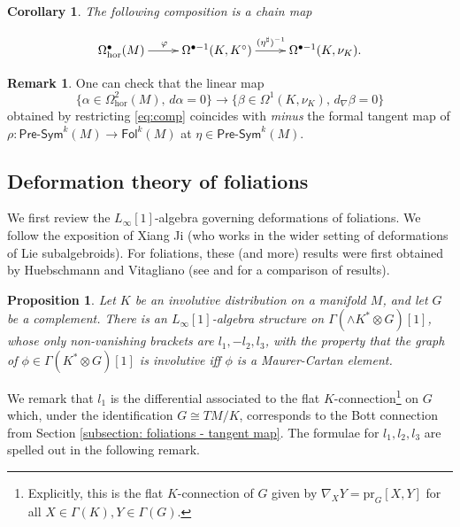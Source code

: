 \documentclass[11pt,thmsa]{amsart}
\newtheorem{proposition}[theorem]{Proposition}
\newtheorem{corollary}[theorem]{Corollary}
\theoremstyle{definition}
\newtheorem{remark}[theorem]{Remark}
\newcommand{\Presym}{\mathsf{Pre}\textrm{-}\mathsf{Sym}}
\newcommand{\hor}{\mathrm{hor}}
\newcommand{\Foliations}{\mathsf{Fol}}
\begin{document}
 \begin{corollary}\label{rem:Bottchainmap}
 The following composition is a chain map
 
\begin{equation}\label{eq:comp}
\xymatrix{
 \Omega^\bullet_\hor(M) \ar[r]^(0.45){\varphi} & \Omega^{\bullet-1}(K,K^\circ) \ar[r]^{(\eta^\sharp)^{-1}} & \Omega^{\bullet-1}(K,\nu_K).
 }
\end{equation}
 \end{corollary}

\begin{remark}
 One can check that the linear map
$$\{\alpha \in \Omega^2_\hor(M),\, d\alpha=0\} \to \{\beta \in \Omega^1(K,\nu_K),\, d_{\nabla}\beta=0\}$$
obtained by restricting \eqref{eq:comp}
coincides with {\em minus} the formal tangent map of
$\rho:  \Presym^k(M) \to \Foliations^k(M)$
at $\eta \in \Presym^k(M)$.
\end{remark}


 



\subsection{Deformation theory of foliations}
\label{subsection: deformations of foliations}
 
 
We first review the $L_{\infty}[1]$-algebra governing deformations of foliations.
We follow the exposition of  Xiang Ji \cite[Theorem 4.20]{Ji} (who works in the wider setting of deformations of Lie subalgebroids). For foliations, these (and more) results were first obtained by Huebschmann \cite{Huebsch}  and   Vitagliano \cite{VitaglianoFol} (see \cite[Section 8]{VitaglianoFol} and  \cite[Rem. 4.23]{Ji} for a comparison of results).


\begin{proposition}\label{prop:Ji}
Let $K$ be an involutive distribution on a manifold $M$, and let $G$ be a complement.
There is an $L_{\infty}[1]$-algebra structure on
 $\Gamma(\wedge K^*\otimes G)[1]$, whose only non-vanishing brackets are $l_1,-l_2,l_3$, with the property that the graph of $\phi\in \Gamma(K^*\otimes G)[1]$ is involutive if{f}  $\phi$ is a Maurer-Cartan element.
\end{proposition}

 We remark that $l_1$ is the differential associated to the flat $K$-connection\footnote{Explicitly, this is the flat $K$-connection of $G$ given by $\nabla_XY=\mathrm{pr}_G[X,Y]$ for all $X\in \Gamma(K), Y\in \Gamma(G)$.}  on $G$ which, under the identification $G\cong TM/K$, corresponds to the Bott connection from Section \ref{subsection: foliations - tangent map}. 
  The formulae for $l_1,l_2,l_3$ are spelled out in the following remark. 
 
\end{document}

